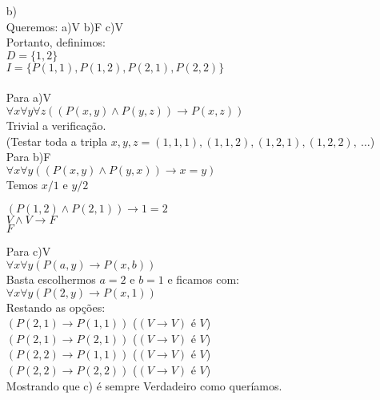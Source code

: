 \documentclass[12pt]{article}
\begin{document}
\begin{itemize}
\begin{itemize}
					\item[b)]
						\hfill\\
						Queremos: a)V b)F c)V\\
						Portanto, definimos:\\
						$D = \lbrace 1, 2 \rbrace$\\
						$I = \lbrace P(1, 1), P(1, 2), P(2, 1), P(2, 2)\rbrace$\\ \\
						Para a)V\\
						$\forall x \forall y \forall z ((P(x,y) \wedge P(y,z)) \rightarrow P(x, z))$\\
						Trivial a verificação.\\
						(Testar toda a tripla $x, y, z = (1, 1, 1), (1, 1, 2),
						(1, 2, 1), (1, 2, 2), \ \dots$)\\
						
						Para b)F\\
						$\forall x \forall y ((P(x,y) \wedge P(y,x)) \rightarrow x = y)$\\
						Temos $x/1$ e $y/2$\\
						\begin{center}
							$(P(1,2) \wedge P(2,1)) \rightarrow 1 = 2$\\
							$V \wedge V \rightarrow F$\\
							$F$
						\end{center}
						Para c)V\\
						$\forall x \forall y (P(a,y) \rightarrow P(x, b))$\\
						Basta escolhermos $a = 2$ e $b = 1$ e ficamos com:\\
						$\forall x \forall y (P(2,y) \rightarrow P(x, 1))$\\
						Restando as opções:\\
						$(P(2,1) \rightarrow P(1, 1))$  ($(V \rightarrow V)$ é $V$)\\
						$(P(2,1) \rightarrow P(2, 1))$  ($(V \rightarrow V)$ é $V$)\\
						$(P(2,2) \rightarrow P(1, 1))$  ($(V \rightarrow V)$ é $V$)\\
						$(P(2,2) \rightarrow P(2, 2))$  ($(V \rightarrow V)$ é $V$)\\
						Mostrando que c) é sempre Verdadeiro como queríamos.
					
					
					
			\end{itemize}
		
	\end{itemize}
\end{document}
